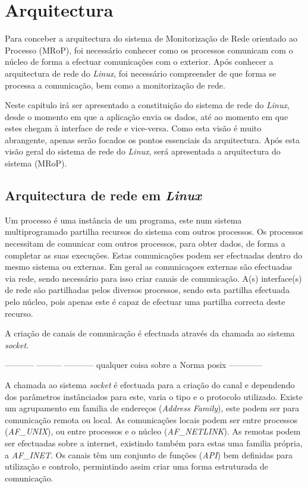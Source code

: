 \chapter{Arquitectura}
\label{cap:Estrutura}

Para conceber a arquitectura do sistema de Monitorização de Rede orientado ao Processo (MRoP), foi necessário conhecer como os processos comunicam com o núcleo de forma a efectuar comunicações com o exterior.
Após conhecer a arquitectura de rede do \textit{Linux}, foi necessário compreender de que forma se processa a comunicação, bem como a monitorização de rede.

Neste capitulo irá ser apresentado a constituição do sistema de rede do \textit{Linux}, desde o momento em que a aplicação envia os dados, até ao momento em que estes chegam à interface de rede e vice-versa.
Como esta visão é muito abrangente, apenas serão focados os pontos essenciais da arquitectura.
Após esta visão geral do sistema de rede do \textit{Linux}, será apresentada a arquitectura do sistema (MRoP).


\section{Arquitectura de rede em \textit{Linux}}
\label{sub:network}

Um processo é uma instância de um programa, este num sistema multiprogramado partilha recursos do sistema com outros processos.
Os processos necessitam de comunicar com outros processos, para obter dados, de forma a completar as suas execuções.
Estas comunicações podem ser efectuadas dentro do mesmo sistema ou externas.
Em geral as comunicaçoes externas são efectuadas via rede, sendo necessário para isso criar canais de comunicação.
A(s) interface(s) de rede são partilhadas pelos diversos processos, sendo esta partilha efectuada pelo núcleo, pois apenas este é capaz de efectuar uma partilha correcta deste recurso.

A criação de canais de comunicação é efectuada através da chamada ao sistema \textit{socket}.

----------- --------- ----------- qualquer coisa sobre a Norma posix ------------

A chamada ao sistema \textit{socket} é efectuada para a criação do canal e dependendo dos parâmetros instânciados para este, varia o tipo e o protocolo utilizado.
Existe um agrupamento em familia de endereços (\textit{Address Family}), este podem ser para comunicação remota ou local.
As comunicações locais podem ser entre processos (\textit{AF\_UNIX}), ou entre processos e o núcleo (\textit{AF\_NETLINK}).
As remotas podem ser efectuadas sobre a internet, existindo também para estas uma familia própria, a \textit{AF\_INET}.
Os canais têm um conjunto de funções (\textit{API}) bem definidas para utilização e controlo, permintindo assim criar uma forma estruturada de comunicação.

